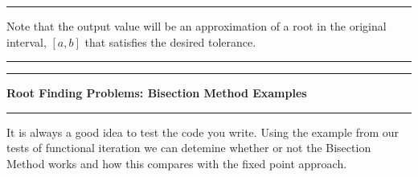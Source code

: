 \documentclass[10pt,fleqn]{article}
\begin{document}
\vskip0.1in\hrule\vskip0.1in
\noindent
Note that the output value will be an approximation of a root in the original
interval, $[a,b]$ that satisfies the desired tolerance.
\vskip0.1in\hrule\vskip0.1in
\newpage
\vskip0.1in\hrule\vskip0.1in
\noindent
{\bf Root Finding Problems: Bisection Method Examples}
\vskip0.1in\hrule\vskip0.1in
\noindent
It is always a good idea to test the code you write. Using the example from our
tests of functional iteration we can detemine whether or not the Bisection 
Method works and how this compares with the fixed point approach.
\end{document}
